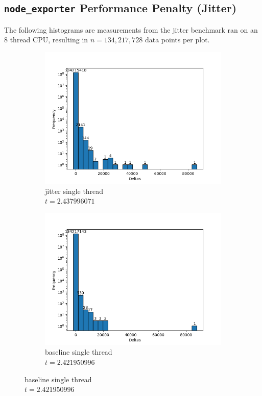 \subsection{\texttt{node\_exporter} Performance Penalty (Jitter)}
The following histograms are measurements from the jitter benchmark ran on an 8 thread CPU, resulting in $n=134,217,728$ data points per plot.
\begin{figure}[H]
\centering
\begin{subfigure}{.42\textwidth}
  \centering
  \includegraphics[width=\textwidth]{./plots_jitter/jitter/output_size_1_rank_0_25.png}
  \caption{jitter single thread\\$t=2.437996071$}
\end{subfigure}%
\begin{subfigure}{.42\textwidth}
  \centering
  \includegraphics[width=\textwidth]{./plots_jitter/jitter_baseline/output_size_1_rank_0_25.png}
  \caption{baseline single thread\\$t=2.421950996$}
\end{subfigure}


\end{figure}
